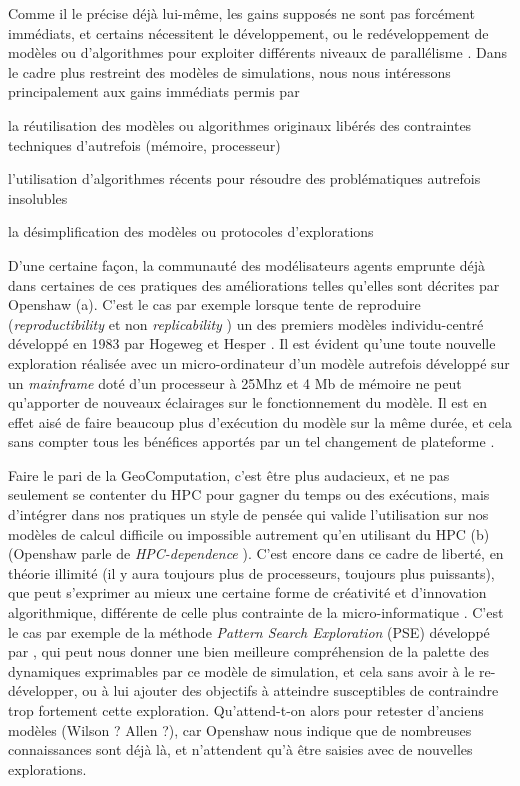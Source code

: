 Comme il le précise déjà lui-même, les gains supposés ne sont pas forcément immédiats, et certains nécessitent le développement, ou le redéveloppement de modèles ou d'algorithmes pour exploiter différents niveaux de parallélisme . Dans le cadre plus restreint des modèles de simulations, nous nous intéressons principalement aux gains immédiats permis par \begin{enumerate*}[label=(\alph*)]  \item la réutilisation des modèles ou algorithmes originaux libérés des contraintes techniques d'autrefois (mémoire, processeur)  \item l'utilisation d'algorithmes récents pour résoudre des problématiques autrefois insolubles \item la désimplification des modèles ou protocoles d'explorations \end{enumerate*}

D'une certaine façon, la communauté des modélisateurs agents emprunte déjà dans certaines de ces pratiques des améliorations telles qu'elles sont décrites par Openshaw (a). C'est le cas par exemple lorsque \autocite{Brearcliffe2014} tente de reproduire (\textit{reproductibility} et non \textit{replicability} ) un des premiers modèles individu-centré développé en 1983 par Hogeweg et Hesper \autocite{Hogeweg1983}. Il est évident qu'une toute nouvelle exploration réalisée avec un micro-ordinateur d'un modèle autrefois développé sur un \textit{mainframe} doté d'un processeur à 25Mhz et 4 Mb de mémoire ne peut qu'apporter de nouveaux éclairages sur le fonctionnement du modèle. Il est en effet aisé de faire beaucoup plus d'exécution du modèle sur la même durée, et cela sans compter tous les bénéfices apportés par un tel changement de plateforme \autocite{Wilensky2007a}.

Faire le pari de la GeoComputation, c'est être plus audacieux, et ne pas seulement se contenter du HPC pour gagner du temps ou des exécutions, mais d'intégrer dans nos pratiques un style de pensée qui valide l'utilisation sur nos modèles de calcul difficile ou impossible autrement qu'en utilisant du HPC (b)(Openshaw parle de \textit{HPC-dependence} ). C'est encore dans ce cadre de liberté, en théorie illimité (il y aura toujours plus de processeurs, toujours plus puissants), que peut s'exprimer au mieux une certaine forme de créativité et d'innovation algorithmique, différente de celle plus contrainte de la micro-informatique \autocite[26-28]{Openshaw2000}. C'est le cas par exemple de la méthode \textit{Pattern Search Exploration} (PSE) développé par \textcite{Cherel2015}, qui peut nous donner une bien meilleure compréhension de la palette des dynamiques exprimables par ce modèle de simulation, et cela sans avoir à le re-développer, ou à lui ajouter des objectifs à atteindre susceptibles de contraindre trop fortement cette exploration. Qu'attend-t-on alors pour retester d'anciens modèles (Wilson ? Allen ?), car Openshaw nous indique que de nombreuses connaissances sont déjà là, et n'attendent qu'à être saisies avec de nouvelles explorations.

